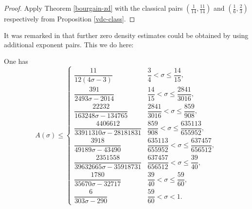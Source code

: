 \literature
{}

\begin{proof} Apply Theorem \ref{bourgain-zd} with the classical pairs $(\frac{1}{14},\frac{11}{14})$ and $(\frac{1}{6}, \frac{2}{3})$ respectively from Proposition \ref{vdc-class}.
\end{proof}

It was remarked in \cite{bourgain_remarks_1995} that further zero density estimates could be obtained by using additional exponent pairs.  This we do here:

\begin{corollary}\label{bourgain-zero-density-optimized} One has
\[
A(\sigma) \leq \begin{cases}
\dfrac{11}{12 \left(4 \sigma - 3\right)} & \dfrac{3}{4} < \sigma \le \dfrac{14}{15},\\
\dfrac{391}{2493 \sigma - 2014} & \dfrac{14}{15} < \sigma \le \dfrac{2841}{3016},\\
\dfrac{22232}{163248 \sigma - 134765} & \dfrac{2841}{3016} < \sigma \le \dfrac{859}{908},\\
\dfrac{4406612}{33911310 \sigma - 28181831} & \dfrac{859}{908} < \sigma \le \dfrac{635113}{655952},\\
\dfrac{3918}{49189 \sigma - 43490} & \dfrac{635113}{655952} < \sigma \le \dfrac{637457}{656512},\\
\dfrac{2351558}{39632665 \sigma - 35918731} & \dfrac{637457}{656512} < \sigma \le \dfrac{39}{40},\\
\dfrac{1780}{35670 \sigma - 32717} & \dfrac{39}{40} < \sigma \le \dfrac{59}{60},\\
\dfrac{6}{303 \sigma - 290} & \dfrac{59}{60} < \sigma < 1.
\end{cases}
\]
\end{corollary}

